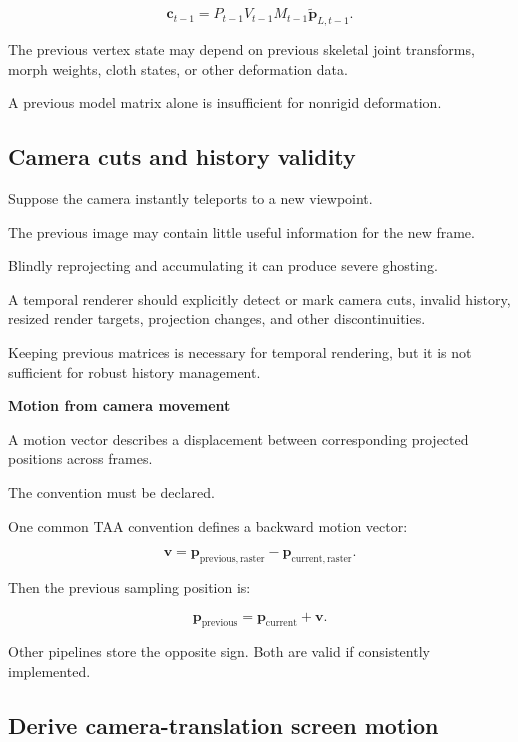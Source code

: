 \[
 \boxed{ \mathbf c_{t-1}= P_{t-1}V_{t-1}M_{t-1}\tilde{\mathbf p}_{L,t-1} }.
\]

The previous vertex state may depend on previous skeletal joint transforms, morph weights, cloth states, or other deformation data.

A previous model matrix alone is insufficient for nonrigid deformation.

\subsection{Camera cuts and history validity}\label{02-foundations-ii-ch036-camera-cuts-and-history-validity}

Suppose the camera instantly teleports to a new viewpoint.

The previous image may contain little useful information for the new frame.

Blindly reprojecting and accumulating it can produce severe ghosting.

A temporal renderer should explicitly detect or mark camera cuts, invalid history, resized render targets, projection changes, and other discontinuities.

Keeping previous matrices is necessary for temporal rendering, but it is not sufficient for robust history management.

\textbf{Motion from camera movement}

A motion vector describes a displacement between corresponding projected positions across frames.

The convention must be declared.

One common TAA convention defines a backward motion vector:

\[
 \boxed{ \mathbf v= \mathbf p_{\mathrm{previous,raster}} - \mathbf p_{\mathrm{current,raster}} }.
\]

Then the previous sampling position is:

\[
 \boxed{ \mathbf p_{\mathrm{previous}} = \mathbf p_{\mathrm{current}}+\mathbf v }.
\]

Other pipelines store the opposite sign. Both are valid if consistently implemented.

\subsection{Derive camera-translation screen motion}\label{02-foundations-ii-ch036-derive-camera-translation-screen-motion}

